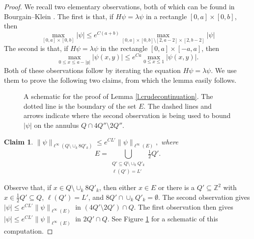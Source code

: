 \documentclass{amsart}
\newtheorem{claim}[equation]{Claim}
\newcommand{\lref}[1]{Lemma \ref{l.#1}}
\newcommand{\fref}[1]{Figure \ref{f.#1}}
\numberwithin{equation}{section}
\numberwithin{figure}{section}
\newcommand{\Z}{\mathbb{Z}}
\begin{document}
\begin{proof}
We recall two elementary observations, both of which can be found in Bourgain--Klein \cite{Bourgain-Klein}.  The first is that, if $H \psi = \lambda \psi$ in a rectangle $[0,a] \times [0,b]$, then
\begin{equation*}
\max_{[0,a] \times [0,b]} |\psi| \leq e^{C(a+b)} \max_{[0,a] \times [0,b] \setminus [2,a-2] \times [2,b-2]} |\psi|
\end{equation*}
The second is that, if $H \psi = \lambda \psi$ in the rectangle $[0,a] \times [-a,a]$, then
\begin{equation*}
\max_{0 \leq x \leq a - |y|} |\psi(x,y)| \leq e^{Ca} \max_{0 \leq x \leq 1} |\psi(x,y)|.
\end{equation*}
Both of these observations follow by iterating the equation $H \psi = \lambda \psi$.  We use them to prove the following two claims, from which the lemma easily follows.

\begin{figure}[t]
\caption{A schematic for the proof of \lref{crudecontinuation}.  The dotted line is the boundary of the set $E$.  The dashed lines and arrows indicate where the second observation is being used to bound $|\psi|$ on the annulus $Q \cap 4Q'' \setminus 2 Q''$.}
\label{f.crude}
\end{figure}

\begin{claim}
$\| \psi \|_{\ell^\infty(Q \setminus \cup_k 8 Q'_k)} \leq e^{C L'} \| \psi \|_{\ell^\infty(E)},$
where
\begin{equation*}
E = \bigcup_{\substack{Q' \subseteq Q \setminus \cup_k Q'_k \\ \ell(Q') = L'}} \tfrac12 Q'.
\end{equation*}
\end{claim}

Observe that, if $x \in Q \setminus \cup_k 8 Q'_k$, then either $x \in E$ or there is a $Q' \subseteq \Z^2$ with $x \in \tfrac12 Q' \subseteq Q$, $\ell(Q') = L'$, and $8Q' \cap \cup_k Q'_k = \emptyset$.  The second observation gives $|\psi| \leq e^{C L'} \| \psi \|_{\ell^\infty(E)}$ in $(4 Q' \setminus 2 Q') \cap Q$.  The first observation then gives $|\psi| \leq e^{C L'} \| \psi \|_{\ell^\infty(E)}$ in $2 Q' \cap Q$.  See \fref{crude} for a schematic of this computation.


\end{proof}
\end{document}
